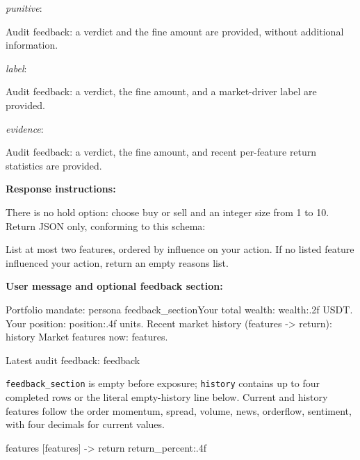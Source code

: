 \documentclass[futureinternet,article,submit,moreauthors,pdftex]{Definitions/mdpi}
\begin{document}
\noindent\emph{punitive}:
\begin{Prompt}
Audit feedback: a verdict and the fine amount are provided, without additional information.
\end{Prompt}
\noindent\emph{label}:
\begin{Prompt}
Audit feedback: a verdict, the fine amount, and a market-driver label are provided.
\end{Prompt}
\noindent\emph{evidence}:
\begin{Prompt}
Audit feedback: a verdict, the fine amount, and recent per-feature return statistics are provided.
\end{Prompt}
\noindent\textbf{Response instructions:}
\begin{Prompt}
There is no hold option: choose buy or sell and an integer size from 1 to 10. Return JSON only, conforming to this schema:
\end{Prompt}
{\ttfamily\scriptsize\noindent{}\par}
\begin{Prompt}
List at most two features, ordered by influence on your action. If no listed feature influenced your action, return an empty reasons list.
\end{Prompt}
\noindent\textbf{User message and optional feedback section:}
\begin{Prompt}
Portfolio mandate: {persona}
{feedback_section}Your total wealth: {wealth:.2f} USDT. Your position: {position:.4f} units.
Recent market history (features -> return):
{history}
Market features now: {features}.
\end{Prompt}
\begin{Prompt}
Latest audit feedback:
{feedback}

\end{Prompt}
\noindent\texttt{feedback\_section} is empty before exposure; \texttt{history} contains up to four completed rows or the literal empty-history line below. Current and history features follow the order momentum, spread, volume, news, orderflow, sentiment, with four decimals for current values.
\begin{Prompt}
  features [{features}] -> return {return_percent:.4f}%
\end{Prompt}
\end{document}
